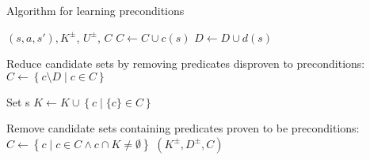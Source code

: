 \documentclass[../../Master.tex]{subfiles}
\begin{document}
\begin{algorithm}
    \caption{Algorithm for learning preconditions}
    \label{algo:precondLearn}

    \begin{algorithmic}
         {$\left( s, a, s'\right), K^\pm$, $U^\pm$, $C$}
                \State $C \gets C \cup c(s)$
                \State $D \gets D \cup d(s)$
            \EndIf

            \State Reduce candidate sets by removing predicates disproven to preconditions:
            \State $C \gets \left\{ c \setminus D \; | \; c \in C \right\}$

            \State Set s
            \State $K \gets K \cup \left\{ c \; | \; \{c\} \in C \right\}$

            \State Remove candidate sets containing predicates proven to be preconditions:
            \State $C \gets \left\{ c \; | \; c \in C \land c \cap K \neq \emptyset \right\}$
            \State \Return $(K^\pm, D^\pm, C)$
        \EndFunction
    \end{algorithmic}
\end{algorithm}
\end{document}

